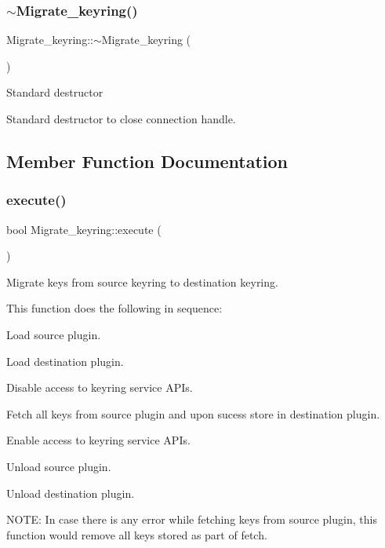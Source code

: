 \subsubsection{\texorpdfstring{$\sim$\+Migrate\+\_\+keyring()}{~Migrate\_keyring()}}
{\footnotesize\ttfamily Migrate\+\_\+keyring\+::$\sim$\+Migrate\+\_\+keyring (\begin{DoxyParamCaption}{ }\end{DoxyParamCaption})}

Standard destructor

Standard destructor to close connection handle. 

\subsection{Member Function Documentation}
\mbox{\label{classMigrate__keyring_aed008849efeecefdebeee6047d54ff54}} 
\subsubsection{\texorpdfstring{execute()}{execute()}}
{\footnotesize\ttfamily bool Migrate\+\_\+keyring\+::execute (\begin{DoxyParamCaption}{ }\end{DoxyParamCaption})}

Migrate keys from source keyring to destination keyring.

This function does the following in sequence\+:
\begin{DoxyEnumerate}
\item Load source plugin.
\item Load destination plugin.
\item Disable access to keyring service A\+P\+Is.
\item Fetch all keys from source plugin and upon sucess store in destination plugin.
\item Enable access to keyring service A\+P\+Is.
\item Unload source plugin.
\item Unload destination plugin.
\end{DoxyEnumerate}

N\+O\+TE\+: In case there is any error while fetching keys from source plugin, this function would remove all keys stored as part of fetch.

